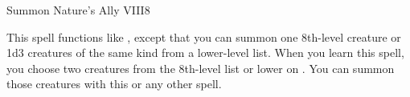 \begin{spellsection}{Summon Nature's Ally VIII}{8}
\begin{spellheader}
\end{spellheader}
\begin{spellcontent}
    \spelleffect This spell functions like , except that you can summon one 8th-level creature or 1d3 creatures of the same kind from a lower-level list. When you learn this spell, you choose two creatures from the 8th-level list or lower on . You can summon those creatures with this or any other  spell.
    \spelldur \durshort \dismissable
\end{spellcontent}
\begin{spellfooter}
\end{spellfooter}
\end{spellsection}

